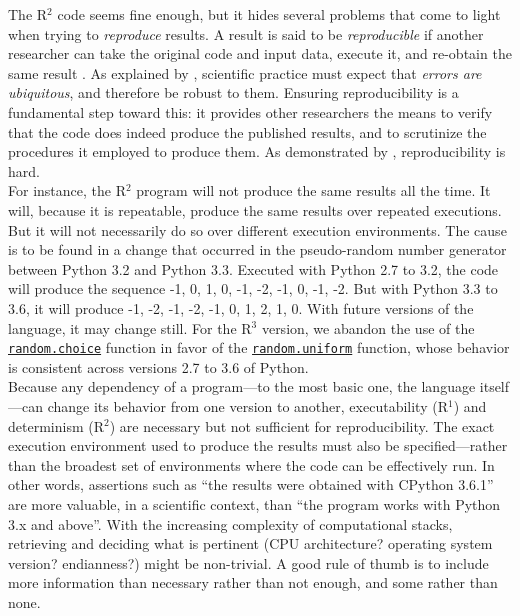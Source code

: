 \documentclass[a4paper,11pt]{article}
\begin{document}
The R$^2$ code seems fine enough, but it hides several problems that come to light when trying to {\em reproduce} results. A result is said to be \emph{reproducible} if another researcher can take the original code and input data, execute it, and re-obtain the same result \parencite{Peng:2006}. As explained by \citeauthor{Donoho:2009} \parencite{Donoho:2009}, scientific practice must expect that {\em errors are ubiquitous}, and therefore be robust to them. Ensuring reproducibility is a fundamental step toward this: it provides other researchers the means to verify that the code does indeed produce the published results, and to scrutinize the procedures it employed to produce them. As demonstrated by \citeauthor{Mesnard:2016} \citep{Mesnard:2016}, reproducibility is hard.\\

For instance, the R$^2$ program will not produce the same results all the time. It will, because it is repeatable, produce the same results over repeated executions. But it will not necessarily do so over different execution environments. The cause is to be found in a change that occurred in the pseudo-random number generator between Python 3.2 and Python 3.3. Executed with Python 2.7 to 3.2, the code will produce the sequence -1, 0, 1, 0, -1, -2, -1, 0, -1, -2. But with Python 3.3 to 3.6, it will produce -1, -2, -1, -2, -1, 0, 1, 2, 1, 0. With future versions of the language, it may change still. For the R$^3$ version, we abandon the use of the {\tt \href{https://docs.python.org/3.6/library/random.html#random.choice}{random.choice}} function in favor of the {\tt \href{https://docs.python.org/3.6/library/random.html#random.uniform}{random.uniform}} function, whose behavior is consistent across versions 2.7 to 3.6 of Python.\\

Because any dependency of a program---to the most basic one, the language itself---can change its behavior from one version to another, executability (R$^1$) and determinism (R$^2$) are necessary but not sufficient for reproducibility. The exact execution environment used to produce the results must also be specified---rather than the broadest set of environments where the code can be effectively run. In other words, assertions such as \enquote{the results were obtained with CPython 3.6.1} are more valuable, in a scientific context, than \enquote{the program works with Python 3.x and above}. With the increasing complexity of computational stacks, retrieving and deciding what is pertinent (CPU architecture? operating system version? endianness?) might be non-trivial. A good rule of thumb is to include more information than necessary rather than not enough, and some rather than none.\\
\end{document}
